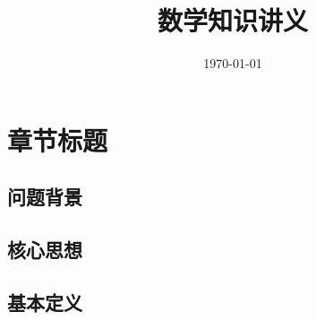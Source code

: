 \documentclass[
    lang=cn,
    color=blue,
    mode=fancy,
    thmcnt=section,
    scheme=chinese
]{elegantbook}
\title{数学知识讲义}
\subtitle{}
\author{}
\institute{}
\date{\today}
\begin{document}

\maketitle



\frontmatter

\tableofcontents



\mainmatter


\chapter{章节标题}


\begin{introduction}

    \item 
    \item 
    \item 
    \item 

\end{introduction}


\section{问题背景}



\section{核心思想}



\section{基本定义}
\end{document}
